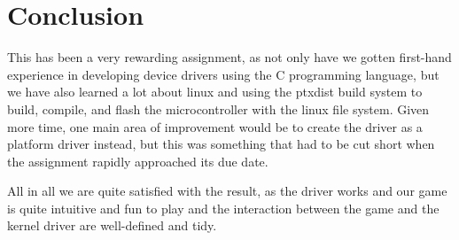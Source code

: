 \section{Conclusion}

This has been a very rewarding assignment, as not only have we gotten first-hand experience in developing device drivers using the C programming language, but we have also learned a lot about linux and using the ptxdist build system to build, compile, and flash the microcontroller with the linux file system. Given more time, one main area of improvement would be to create the driver as a platform driver instead, but this was something that had to be cut short when the assignment rapidly approached its due date.

All in all we are quite satisfied with the result, as the driver works and our game is quite intuitive and fun to play and the interaction between the game and the kernel driver are well-defined and tidy.